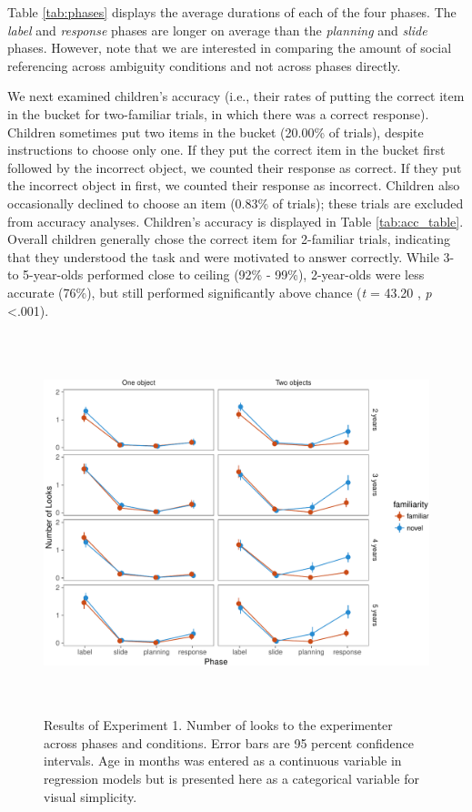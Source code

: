 \documentclass[a4paper,man,apacite,floatsintext]{apa6}
\newenvironment{CodeChunk}{}{}
\begin{document}
Table \ref{tab:phases} displays the average durations of each of the
four phases. The \emph{label} and \emph{response} phases are longer on
average than the \emph{planning} and \emph{slide} phases. However, note
that we are interested in comparing the amount of social referencing
across ambiguity conditions and not across phases directly.

We next examined children's accuracy (i.e., their rates of putting the
correct item in the bucket for two-familiar trials, in which there was a
correct response). Children sometimes put two items in the bucket
(20.00\% of trials), despite instructions to choose only one. If they
put the correct item in the bucket first followed by the incorrect
object, we counted their response as correct. If they put the incorrect
object in first, we counted their response as incorrect. Children also
occasionally declined to choose an item (0.83\% of trials); these trials
are excluded from accuracy analyses. Children's accuracy is displayed in
Table \ref{tab:acc_table}. Overall children generally chose the correct
item for 2-familiar trials, indicating that they understood the task and
were motivated to answer correctly. While 3- to 5-year-olds performed
close to ceiling (92\% - 99\%), 2-year-olds were less accurate (76\%),
but still performed significantly above chance (\emph{t} = 43.20 ,
\emph{p} \textless{}.001).

\begin{CodeChunk}
\begin{figure}[h]

{\centering \includegraphics[width=5.75in,height=4.35in]{figs/results_e1-1} 

}

\caption[Results of Experiment 1]{Results of Experiment 1. Number of looks to the experimenter across phases and conditions. Error bars are 95 percent confidence intervals. Age in months was entered as a continuous variable in regression models but is presented here as a categorical variable for visual simplicity.}\label{fig:results_e1}
\end{figure}
\end{CodeChunk}
\end{document}
